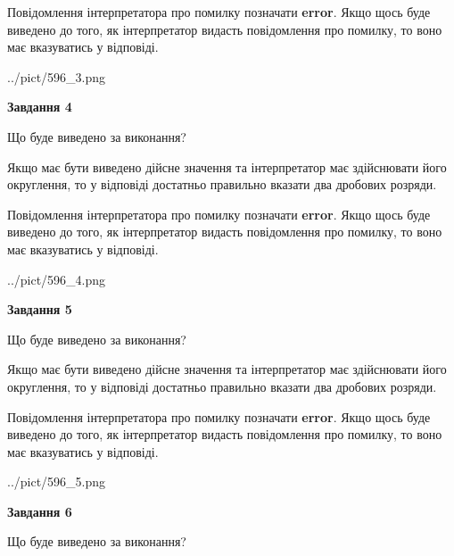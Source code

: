\documentclass[12pt, ukrainian]{article}
\begin{document}
{\begin {Large}
Повідомлення інтерпретатора про помилку позначати \textbf{error}.
Якщо щось буде виведено до того, як інтерпретатор видасть повідомлення про помилку, 
то воно має вказуватись у відповіді. \par

\begin{center}
	{../pict/596_3.png}
\end{center}
\newpage

{\begin {center}\textbf{Завдання 4}\end {center}}\par
Що буде виведено за виконання? \par

Якщо має бути виведено дійсне значення та інтерпретатор має здійснювати його округлення, 
то у відповіді достатньо правильно вказати два дробових розряди.

Повідомлення інтерпретатора про помилку позначати \textbf{error}.
Якщо щось буде виведено до того, як інтерпретатор видасть повідомлення про помилку, 
то воно має вказуватись у відповіді. \par

\begin{center}
	{../pict/596_4.png}
\end{center}
\newpage

{\begin {center}\textbf{Завдання 5}\end {center}}\par
Що буде виведено за виконання? \par

Якщо має бути виведено дійсне значення та інтерпретатор має здійснювати його округлення, 
то у відповіді достатньо правильно вказати два дробових розряди.

Повідомлення інтерпретатора про помилку позначати \textbf{error}.
Якщо щось буде виведено до того, як інтерпретатор видасть повідомлення про помилку, 
то воно має вказуватись у відповіді. \par

\begin{center}
	{../pict/596_5.png}
\end{center}
\newpage

{\begin {center}\textbf{Завдання 6}\end {center}}\par
Що буде виведено за виконання? \par


\end{Large}}
\end{document}

